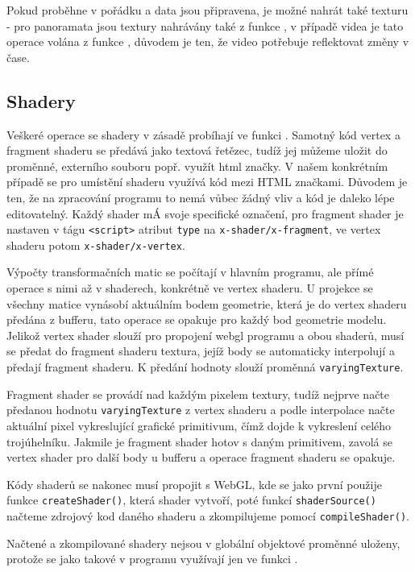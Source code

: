 Pokud  \texttt{\setupProgram} proběhne v pořádku a  data jsou připravena, je možné nahrát také texturu - pro panoramata jsou textury nahrávány také z funkce \texttt{\setupProgram}, v případě videa je tato operace  volána z funkce \texttt{\render}, důvodem je ten, že video potřebuje reflektovat změny v čase.



\subsection{Shadery}
Veškeré operace se shadery v zásadě probíhají ve funkci \texttt{\setupProgram}. Samotný kód vertex a fragment shaderu se předává jako textová řetězec, tudíž jej můžeme uložit do proměnné, externího souboru popř. využít html značky. V našem konkrétním případě  se pro umístění shaderu využívá kód mezi HTML značkami. Důvodem je ten, že na zpracování programu to nemá vůbec žádný vliv  a  kód je daleko lépe editovatelný. Každý shader mÁ svoje specifické označení, pro fragment shader je nastaven v tágu \texttt{<script>} atribut \texttt{type} na \texttt{x-shader/x-fragment}, ve vertex shaderu potom \texttt{x-shader/x-vertex}.

Výpočty transformačních matic se počítají v hlavním programu, ale přímé operace s nimi až v shaderech, konkrétně ve vertex shaderu. U projekce se všechny matice  vynásobí aktuálním bodem geometrie, která je do vertex shaderu předána z bufferu, tato operace se opakuje pro každý bod geometrie modelu. Jelikož vertex shader slouží pro propojení webgl programu  a obou shaderů, musí se předat do fragment shaderu textura, jejíž body se automaticky interpolují a předají fragment shaderu. K předání hodnoty slouží proměnná \texttt{varyingTexture}.

Fragment shader se provádí nad každým pixelem textury, tudíž nejprve načte předanou hodnotu \texttt{varyingTexture} z vertex shaderu a podle interpolace načte aktuální pixel vykreslující grafické primitivum, čímž dojde k vykreslení celého trojúhelníku. Jakmile je fragment shader hotov s daným primitivem, zavolá se vertex shader pro další body u bufferu a operace fragment shaderu se opakuje.

Kódy shaderů se nakonec musí propojit s WebGL, kde se jako první použije funkce \texttt{createShader()}, která shader vytvoří, poté funkcí \texttt{shaderSource()} načteme zdrojový kod daného shaderu a zkompilujeme pomocí \texttt{compileShader()}.

Načtené a zkompilované shadery nejsou v globální objektové proměnné uloženy, protože se jako takové v programu využívají jen ve funkci \texttt{\setupProgram}.

